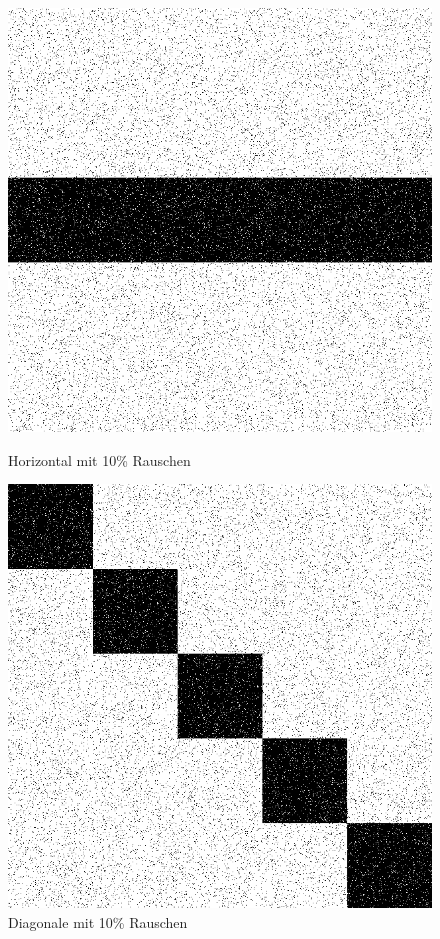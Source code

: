 \begin{figure}[hbt]
	\begin{minipage}{0.49 \textwidth}
		\includegraphics[width=\textwidth]{./Bilder/Auswertung/BeispielBilder/Picture_Line1_noise_10_pixelCnt_128_featureCnt_5}
		\caption{Horizontal mit 10\% Rauschen}
	\end{minipage}
	\hfill
	\begin{minipage}{0.49 \textwidth}
		\includegraphics[width=\textwidth]{./Bilder/Auswertung/BeispielBilder/Picture_Line2_noise_10_pixelCnt_128_featureCnt_5}
		\caption{Diagonale mit 10\% Rauschen}
	\end{minipage}
\end{figure}

